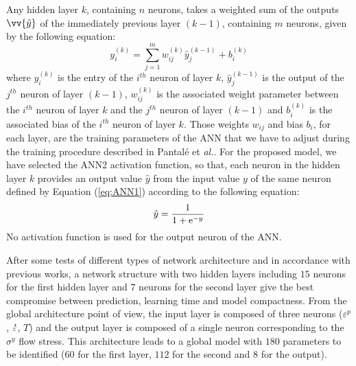\documentclass[twoside,english,1p,final,sort&compress]{elsarticle}
\makeatletter
\theoremstyle{plain}
\DeclareRobustCommand{\e}[1]{{\rm e}^{#1}}
\DeclareRobustCommand{\lay}[1]{^{(#1)}}
\DeclareRobustCommand{\mdot}[1]{\accentset{\mbox{\bfseries .}}{#1}}
\DeclareRobustCommand{\eal}{et \emph{al.}\@\xspace}
\renewcommand{\overrightarrow}{\vv}
\makeatother
\begin{document}
Any hidden layer $k$, containing $n$ neurons, takes a weighted sum of the outputs $\overrightarrow{\hat{y}}$ of the immediately previous layer $(k-1)$, containing $m$ neurons, given by the following equation:
\begin{equation}
y_i\lay{k} = \sum_{j=1}^m w_{ij}\lay{k} \hat{y}_j^{(k-1)}+ b_i\lay{k}\label{eq:ANN1}
\end{equation}
where $y_i\lay{k}$ is the entry of the $i^{th}$ neuron of layer $k$, $\hat{y}_j\lay{k-1}$ is the output of the $j^{th}$ neuron of layer $(k-1)$, $w_{ij}\lay{k}$ is the associated weight parameter between the $i^{th}$ neuron of layer $k$ and the $j^{th}$ neuron of layer $(k-1)$ and $b_i\lay{k}$ is the associated bias of the $i^{th}$ neuron of layer $k$.
Those weights $w_{ij}$ and bias $b_i$, for each layer, are the training parameters of the ANN that we have to adjust during the training procedure described in Pantalé \eal \cite{Pantale-2021}.
For the proposed model, we have selected the ANN2 activation function, so that, each neuron in the hidden layer $k$ provides an output value ${\hat{y}}$ from the input value $y$ of the same neuron defined by Equation (\ref{eq:ANN1}) according to the following equation:
\begin{equation}
\hat{y}=\frac{1}{1 + \e{-y}}\label{eq:ANN2}
\end{equation}
No activation function is used for the output neuron of the ANN.

After some tests of different types of network architecture and in accordance with previous works, a network structure with two hidden layers including $15$ neurons for the first hidden layer and $7$ neurons for the second layer give the best compromise between prediction, learning time and model compactness.
From the global architecture point of view, the input layer is composed of three neurons ($\varepsilon^p$, $\mdot\varepsilon$, $T$) and the output layer is composed of a single neuron corresponding to the $\sigma^y$ flow stress.
This architecture leads to a global model with $180$ parameters to be identified ($60$ for the first layer, $112$ for the second and $8$ for the output).
\end{document}
